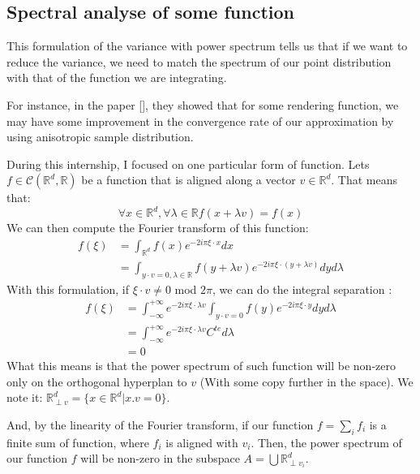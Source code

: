 \documentclass{classeENS}
\begin{document}
\subsection{Spectral analyse of some function}

\> This formulation of the variance with power spectrum tells us 
    that if we want to reduce the variance, we need to match the 
    spectrum of our point distribution with that of the function 
    we are integrating.

\> For instance, in the paper [\cite{singh17convergence}], they showed that for 
    some rendering function, we may have some improvement in the 
    convergence rate of our approximation by using anisotropic 
    sample distribution.

\> During this internship, I focused on one particular form of function.
    Lets $f\in\mathcal C(\mathbb R^d,\mathbb R)$ be a function that 
    is aligned along a vector $v \in \mathbb R^d$. That means that:
    \[ \forall x\in\mathbb R^d, \forall \lambda\in\mathbb R f(x+\lambda v) = f(x) \]
    We can then compute the Fourier transform of this function:
    \begin{align*}
        f(\xi) &= \int_{\mathbb R^d} f(x) e^{-2i\pi \xi\cdot x} dx \\
               &= \int_{y\cdot v=0, \lambda \in \mathbb R } f(y+\lambda v) 
                                    e^{-2i\pi \xi\cdot (y+\lambda v)} dy d\lambda
    \end{align*}
    With this formulation, if $\xi \cdot v \neq 0$ mod $2\pi$, we can do the integral separation : \begin{align*}
        f(\xi) &= \int_{-\infty}^{+\infty} e^{-2i\pi 
            \xi\cdot\lambda v} \int_{y\cdot v=0} f(y) e^{-2i\pi \xi\cdot y}  dy d\lambda \\
            &= \int_{-\infty}^{+\infty} e^{-2i\pi 
            \xi\cdot\lambda v} C^{te} d\lambda \\
            &= 0
    \end{align*}
    What this means is that the power spectrum of such function will be non-zero only on
    the orthogonal hyperplan to $v$ (With some copy further in the space). We note it: 
    $\mathbb R^d_{\perp v} = \{x \in \mathbb R^d | x.v = 0\}$.

\> And, by the linearity of the Fourier transform, if our function $f = \sum_i f_i$ is a finite sum 
    of function, where $f_i$ is aligned with $v_i$. Then, the power spectrum 
    of our function $f$ will be non-zero in the subspace 
    $A = \bigcup \mathbb R^d_{\perp v_i}$.
\end{document}
